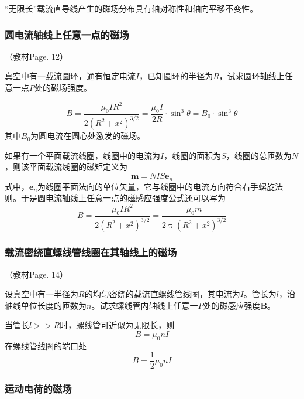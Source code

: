 \documentclass[
	12pt, %
	a4paper, %
]{myLegrandOrangeBook}
\begin{document}
“无限长”载流直导线产生的磁场分布具有轴对称性和轴向平移不变性。

\subsubsection{圆电流轴线上任意一点的磁场}

（教材Page. 12）

真空中有一载流圆环，通有恒定电流\(I\)，已知圆环的半径为\(R\)，试求圆环轴线上任意一点\(P\)处的磁场强度。

\begin{equation}
    B = \frac{\mu_0 I R^2}{2 \left(R^2 + x^2\right)^{3/2}} = \frac{\mu_0 I}{2R} \cdot \sin^3 \theta = B_0 \cdot \sin^3 \theta
\end{equation}
其中\(B_0\)为圆电流在圆心处激发的磁场。

如果有一个平面载流线圈，线圈中的电流为\(I\)，线圈的面积为\(S\)，线圈的总匝数为\(N\)，则该平面载流线圈的磁矩定义为
\begin{equation}
    \mathbf{m} = NIS \mathbf{e}_n
\end{equation}
式中，\(\mathbf{e}_n\)为线圈平面法向的单位矢量，它与线圈中的电流方向符合右手螺旋法则。于是圆电流轴线上任意一点的磁感应强度公式还可以写为
\begin{equation}
    B = \frac{\mu_0 I R^2}{2 \left(R^2 + x^2\right)^{3/2}} = \frac{\mu_0 m}{2 \uppi \left(R^2 + x^2\right)^{3/2}}
\end{equation}

\subsubsection{载流密绕直螺线管线圈在其轴线上的磁场}

（教材Page. 14）

设真空中有一半径为\(R\)的均匀密绕的载流直螺线管线圈，其电流为\(I\)。管长为\(l\)，沿轴线单位长度的匝数为\(n\)。试求螺线管内轴线上任意一\(P\)处的磁感应强度\(\mathbf{B}\)。

当管长\(l >> R\)时，螺线管可近似为无限长，则
\begin{equation}
    B = \mu_0 n I
\end{equation}
在螺线管线圈的端口处
\begin{equation}
    B = \frac{1}{2} \mu_0 n I
\end{equation}

\subsubsection{运动电荷的磁场}
\end{document}
